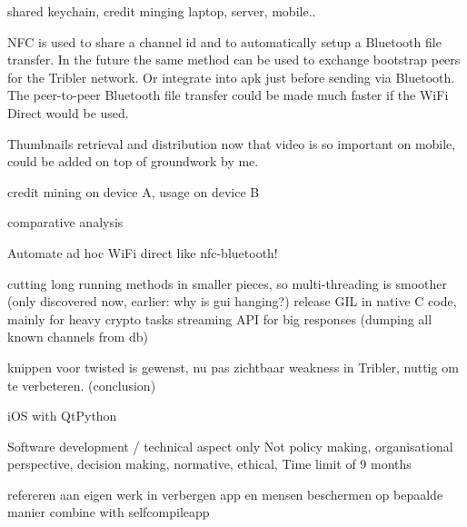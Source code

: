 shared keychain, credit minging laptop, server, mobile..


NFC is used to share a channel id and to automatically setup a Bluetooth file transfer.
In the future the same method can be used to exchange bootstrap peers for the Tribler network. Or integrate into apk just before sending via Bluetooth.
The peer-to-peer Bluetooth file transfer could be made much faster if the WiFi Direct would be used.


Thumbnails retrieval and distribution now that video is so important on mobile, could be added on top of groundwork by me.


credit mining on device A, usage on device B


comparative analysis

Automate ad hoc WiFi direct like nfc-bluetooth!

cutting long running methods in smaller pieces, so multi-threading is smoother (only discovered now, earlier: why is gui hanging?)
release GIL in native C code, mainly for heavy crypto tasks
streaming API for big responses (dumping all known channels from db)

knippen voor twisted is gewenst, nu pas zichtbaar weakness in Tribler, nuttig om te verbeteren. (conclusion)


iOS with QtPython


Software development / technical aspect only
Not policy making, organisational perspective, decision making, normative, ethical,
Time limit of 9 months


refereren aan eigen werk in verbergen app en mensen beschermen op bepaalde manier
combine with selfcompileapp
